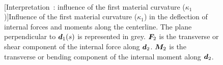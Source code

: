 \begin{figure}[p]
  \begin{leftfullpage}
    \captionsetup[subfloat]{captionskip=10pt}
     	\centering
     	 \\
	\vspace{30pt}
	\vspace{30pt}
	[Interpretation~: influence of the first material curvature ($\kappa_1$)]{Influence of the first material curvature ($\kappa_1$) in the deflection of internal forces and moments along the centerline. The plane perpendicular to $\boldsymbol{d}_1(s)$ is represented in grey. $\boldsymbol{F}_2$ is the transverse or shear component of the internal force along $\boldsymbol{d}_2$. $\boldsymbol{M}_2$ is the transverse or bending component of the internal moment along $\boldsymbol{d}_2$.}
	\label{fig:d1}
 \end{leftfullpage}
\end{figure}
